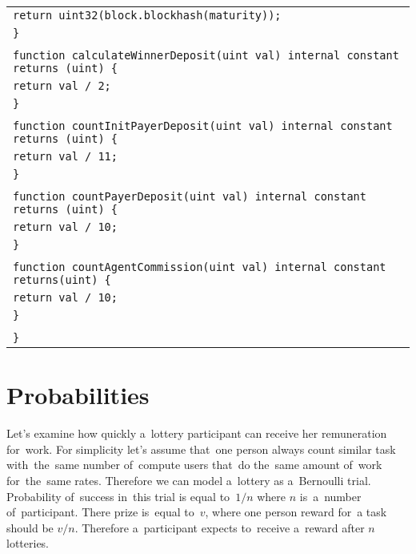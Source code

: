 \documentclass[a4paper]{article}
\begin{document}
\begin{tabularx}{\linewidth}{l}
        \\
        \qquad\qquad\texttt{return uint32(block.blockhash(maturity));}\\
        \qquad\texttt{\}}\\
        \\
        \qquad\texttt{function calculateWinnerDeposit(uint val) internal constant returns (uint) \{}\\
        \qquad\qquad\texttt{return val / 2;}\\
        \qquad\texttt{\}}\\
        \\
        \qquad\texttt{function countInitPayerDeposit(uint val) internal constant returns (uint) \{}\\
        \qquad\qquad\texttt{return val / 11;}\\
        \qquad\texttt{\}}\\
        \\
        \qquad\texttt{function countPayerDeposit(uint val) internal constant returns (uint) \{}\\
        \qquad\qquad\texttt{return val / 10;}\\
        \qquad\texttt{\}}\\
        \\
        \qquad\texttt{function countAgentCommission(uint val) internal constant returns(uint) \{}\\
        \qquad\qquad\texttt{return val / 10;}\\
        \qquad\texttt{\}}\\
        \\
        \texttt{\}}\\
    \end{tabularx}

\section{Probabilities}

    Let's examine how quickly a~lottery participant can receive her remuneration for~work. For simplicity let's assume
    that~one person always count similar task with~the~same number of~compute users that~do the~same amount of~work
    for~the~same rates. Therefore we can model a~lottery as a~Bernoulli trial. Probability of~success in~this trial is
    equal to~$1/n$ where $n$ is~a~number of~participant. There prize is~equal to~$v$, where one person reward for~a
    task should be $v/n$. Therefore a~participant expects to~receive a~reward after $n$ lotteries.
\end{document}
